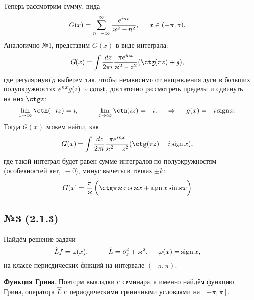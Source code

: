 Теперь рассмотрим сумму, вида
\begin{equation*}
    G(x) = \sum_{n=-\infty}^{\infty} \frac{e^{i n x}}{\kappa^2 - n^2},
    \hspace{5 mm} x \in (-\pi, \pi).
\end{equation*}
Аналогично №1, представим $G(x)$ в виде интеграла:
\begin{equation*}
    G(x) = \int \frac{\d z}{2 \pi i} \frac{\pi e^{i n x}}{\kappa^2-z^2} (\ctg (\pi z) + \tilde{g}),
\end{equation*}
где регулярную $\tilde{g}$ выберем так, чтобы независимо от направления дуги  в больших полуокружностях $e^{n x} g(z) \sim \const$, достаточно рассмотреть пределы и сдвинуть на них $\ctg z$:
\begin{equation*}
    \lim_{z \to \infty} \cth (-  i z) = i,
    \hspace{10 mm} 
    \lim_{z \to \infty} \cth ( i z) = -i,
    \hspace{0.5cm} \Rightarrow \hspace{0.5cm}
    \tilde{g}(x) = - i \sign x.
\end{equation*}
Тогда $G(x)$ можем найти, как
\begin{equation*}
    G(x) = \int \frac{\d z}{2 \pi i} \frac{\pi e^{i n x}}{\kappa^2-z^2} (\ctg (\pi z) - i \sign x),
\end{equation*}
где такой интеграл будет равен сумме интегралов по полуокружностям (особенностей нет, $\equiv 0$), минус вычеты в точках $\pm k$:
\begin{equation*}
    G(x) = \frac{\pi}{\kappa}\left( \vphantom{\bigg|}
        \ctg \pi \kappa \cos \kappa x + \sign x \sin \kappa x
    \right)
\end{equation*}




\subsection*{№3 (2.1.3)}

Найдём решение задачи
\begin{equation*}
    \hat{L} f = \varphi(x),
    \hspace{10 mm} 
    \hat{L} = \partial_x^2 + \kappa^2,
    \hspace{5 mm} 
    \varphi(x) = \sign x,
\end{equation*}
на классе периодических фнкций на интервале $(- \pi, \pi)$.


\textbf{Функция Грина}. 
Повторм выкладки с семинара, а именно найдём функцию Грина, оператора $\hat{L}$
с периодическими граничными условиями на $[-\pi, \pi]$. 

